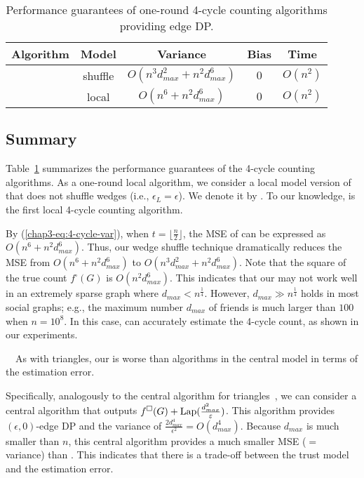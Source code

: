\begin{table}[t]
  \caption{Performance guarantees of one-round 4-cycle counting algorithms providing edge DP.
  }
  \vspace{-4mm}
  \centering
  \begin{tabular}{|l|c|c|c|c|}
    \hline
    Algorithm & Model & Variance & Bias & Time \\ \hline
    \AlgWSCyc{} & shuffle & $O(n^3 d_{max}^2 + n^2 d_{max}^6)$ & $0$ & $O(n^2)$ \\ \hline
    \AlgWLCyc{} & local & $O(n^6 + n^2 d_{max}^6)$ & $0$ & $O(n^2)$ \\ \hline
  \end{tabular}
  \label{chap3-tab:upper_bounds_4cycle}
\end{table}

\subsection{Summary}
\label{chap3-sub:summary_4cycle}
Table~\ref{chap3-tab:upper_bounds_4cycle} summarizes the performance guarantees of the 4-cycle counting algorithms. 
As a one-round local algorithm, we consider a local model version of \AlgWSCyc{} that does not shuffle wedges (i.e., $\epsilon_L = \epsilon$). 
We denote it by \AlgWLCyc{}. 
To our knowledge, \AlgWLCyc{} is the first local 4-cycle counting algorithm. 

By (\ref{chap3-eq:4-cycle-var}), when $t = \lfloor \frac{n}{2} \rfloor$, the MSE of \AlgWLCyc{} can be expressed as $O(n^6 + n^2 d_{max}^6)$. 
Thus, our wedge shuffle technique dramatically reduces the MSE from $O(n^6 + n^2 d_{max}^6)$ to $O(n^3 d_{max}^2 + n^2 d_{max}^6)$. 
Note that the square of the true count $f^\square(G)$ is $O(n^2 d_{max}^6)$. 
This indicates that our \AlgWSCyc{} may not work well in an extremely sparse graph where $d_{max} < n^{\frac{1}{4}}$. 
However, $d_{max} \gg n^{\frac{1}{4}}$ holds in most social graphs; e.g., the maximum number $d_{max}$ of friends is much larger than $100$ when $n=10^8$. 
In this case, \AlgWSCyc{} can accurately estimate the 4-cycle count, as shown in our experiments. 

\smallskip
{}~~As with triangles, our \AlgWSCyc{} is worse than algorithms in the central model in terms of the estimation error. 

Specifically, 
analogously to the central algorithm for triangles~\cite{Imola_USENIX21}, 
we can consider a central algorithm that outputs $f^\square(G) + \textrm{Lap}(\frac{d_{max}^2}{\varepsilon})$. 
This algorithm provides 
$(\epsilon, 0)$-edge DP and the variance of $\frac{2d_{max}^4}{\epsilon^2} = O(d_{max}^4)$. 
Because $d_{max}$ is much smaller than $n$, this central algorithm provides a much smaller MSE ($=$ variance) than \AlgWSCyc{}. 
This indicates 
that there is a trade-off between the trust model and the estimation error. 

